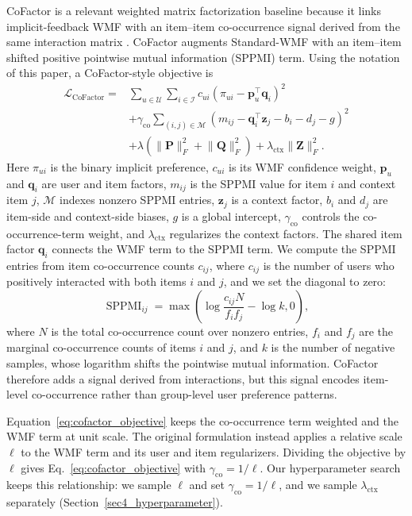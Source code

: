 \documentclass[pdflatex,sn-vancouver-num]{sn-jnl}%
\theoremstyle{thmstyleone}%
\theoremstyle{thmstyletwo}%
\theoremstyle{thmstylethree}%
\begin{document}
CoFactor is a relevant weighted matrix factorization baseline because it links implicit-feedback WMF with an item--item co-occurrence signal derived from the same interaction matrix \cite{liang2016cofactor}. CoFactor augments Standard-WMF with an item--item shifted positive pointwise mutual information (SPPMI) term. Using the notation of this paper, a CoFactor-style objective is
\begin{equation}
\begin{aligned}
\mathcal{L}_{\mathrm{CoFactor}}
=&
\sum_{u\in\mathcal{U}}\sum_{i\in\mathcal{I}}
c_{ui}
\left(
\pi_{ui}-\mathbf{p}_u^{\top}\mathbf{q}_i
\right)^2 \\
&+
\gamma_{\mathrm{co}}
\sum_{(i,j)\in\mathcal{M}}
\left(
m_{ij}
-\mathbf{q}_i^{\top}\mathbf{z}_j
-b_i-d_j-g
\right)^2 \\
&+
\lambda
\left(
\lVert\mathbf{P}\rVert_F^2+
\lVert\mathbf{Q}\rVert_F^2
\right)
+
\lambda_{\mathrm{ctx}}\lVert\mathbf{Z}\rVert_F^2 .
\end{aligned}
\label{eq:cofactor_objective}
\end{equation}
Here $\pi_{ui}$ is the binary implicit preference, $c_{ui}$ is its WMF confidence weight, $\mathbf{p}_u$ and $\mathbf{q}_i$ are user and item factors, $m_{ij}$ is the SPPMI value for item $i$ and context item $j$, $\mathcal{M}$ indexes nonzero SPPMI entries, $\mathbf{z}_j$ is a context factor, $b_i$ and $d_j$ are item-side and context-side biases, $g$ is a global intercept, $\gamma_{\mathrm{co}}$ controls the co-occurrence-term weight, and $\lambda_{\mathrm{ctx}}$ regularizes the context factors. The shared item factor $\mathbf{q}_i$ connects the WMF term to the SPPMI term. We compute the SPPMI entries from item co-occurrence counts $c_{ij}$, where $c_{ij}$ is the number of users who positively interacted with both items $i$ and $j$, and we set the diagonal to zero:
\begin{equation}
\operatorname{SPPMI}_{ij}
=
\max\left(
\log
\frac{c_{ij}N}{f_i f_j}
-
\log k,
0
\right),
\label{eq:sppmi}
\end{equation}
where $N$ is the total co-occurrence count over nonzero entries, $f_i$ and $f_j$ are the marginal co-occurrence counts of items $i$ and $j$, and $k$ is the number of negative samples, whose logarithm shifts the pointwise mutual information. CoFactor therefore adds a signal derived from interactions, but this signal encodes item-level co-occurrence rather than group-level user preference patterns.

Equation~\eqref{eq:cofactor_objective} keeps the co-occurrence term weighted and the WMF term at unit scale. The original formulation instead applies a relative scale $\ell$ to the WMF term and its user and item regularizers. Dividing the objective by $\ell$ gives Eq.~\eqref{eq:cofactor_objective} with $\gamma_{\mathrm{co}}=1/\ell$. Our hyperparameter search keeps this relationship: we sample $\ell$ and set $\gamma_{\mathrm{co}}=1/\ell$, and we sample $\lambda_{\mathrm{ctx}}$ separately (Section~\ref{sec4_hyperparameter}).
\end{document}
